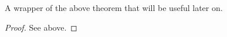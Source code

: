\begin{theorem}[LogOfAnalyticFunction']
\label{LogOfAnalyticFunction'}
\leanok
A wrapper of the above theorem that will be useful later on.
\end{theorem}
\begin{proof}
\leanok
See above.
\end{proof}
